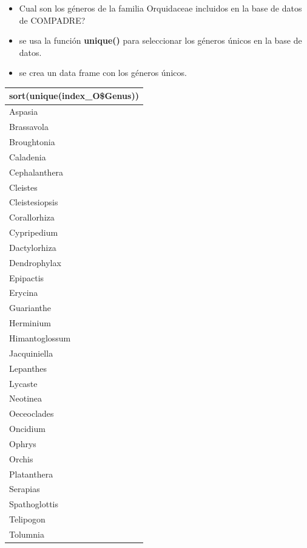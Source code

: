 \documentclass[
]{book}
\newenvironment{Shaded}{\begin{snugshade}}{\end{snugshade}}
\newcommand{\FunctionTok}[1]{\textcolor[rgb]{0.13,0.29,0.53}{\textbf{#1}}}
\newcommand{\NormalTok}[1]{#1}
\newcommand{\OtherTok}[1]{\textcolor[rgb]{0.56,0.35,0.01}{#1}}
\newcommand{\SpecialCharTok}[1]{\textcolor[rgb]{0.81,0.36,0.00}{\textbf{#1}}}
\providecommand{\tightlist}{%
  \setlength{\itemsep}{0pt}\setlength{\parskip}{0pt}}
\theoremstyle{definition}
\theoremstyle{definition}
\theoremstyle{definition}
\theoremstyle{definition}
\theoremstyle{remark}
\begin{document}
\begin{itemize}
\tightlist
\item
  Cual son los géneros de la familia Orquidaceae incluidos en la base de datos de COMPADRE?
\item
  se usa la función \textbf{unique()} para seleccionar los géneros únicos en la base de datos.
\item
  se crea un data frame con los géneros únicos.
\end{itemize}

\begin{Shaded}
\end{Shaded}

\begin{longtable}{l}
\toprule
sort(unique(index\_O\$Genus)) \\ 
\midrule\addlinespace[2.5pt]
Aspasia \\ 
Brassavola \\ 
Broughtonia \\ 
Caladenia \\ 
Cephalanthera \\ 
Cleistes \\ 
Cleistesiopsis \\ 
Corallorhiza \\ 
Cypripedium \\ 
Dactylorhiza \\ 
Dendrophylax \\ 
Epipactis \\ 
Erycina \\ 
Guarianthe \\ 
Herminium \\ 
Himantoglossum \\ 
Jacquiniella \\ 
Lepanthes \\ 
Lycaste \\ 
Neotinea \\ 
Oeceoclades \\ 
Oncidium \\ 
Ophrys \\ 
Orchis \\ 
Platanthera \\ 
Serapias \\ 
Spathoglottis \\ 
Telipogon \\ 
Tolumnia \\ 
\bottomrule
\end{longtable}
\end{document}
